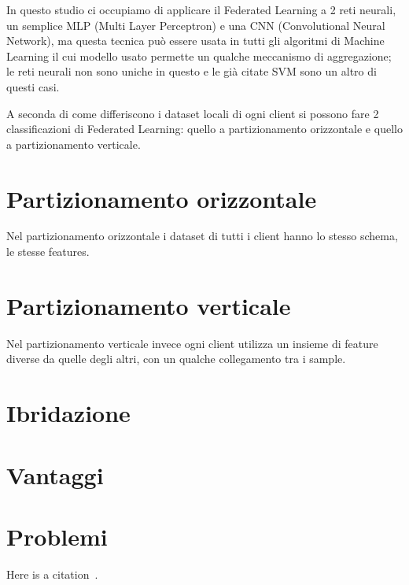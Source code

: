 In questo studio ci occupiamo di applicare il Federated Learning a 2 reti neurali,
un semplice MLP (Multi Layer Perceptron) e una CNN (Convolutional Neural Network),
ma questa tecnica può essere usata in tutti gli algoritmi di Machine Learning il
cui modello usato permette un qualche meccanismo di aggregazione; le reti neurali
non sono uniche in questo e le già citate SVM sono un altro di questi casi.

A seconda di come differiscono i dataset locali di ogni client si possono
fare 2 classificazioni di Federated Learning: quello a partizionamento orizzontale
e quello a partizionamento verticale.

\section{Partizionamento orizzontale}
Nel partizionamento orizzontale i dataset di tutti i client hanno lo
stesso schema, le stesse features.

\section{Partizionamento verticale}
Nel partizionamento verticale invece ogni client utilizza un insieme 
di feature diverse da quelle degli altri, con un qualche collegamento 
tra i sample.

\section{Ibridazione}

\section{Vantaggi}

\section{Problemi}

Here is a citation~\cite{einstein1905}.
